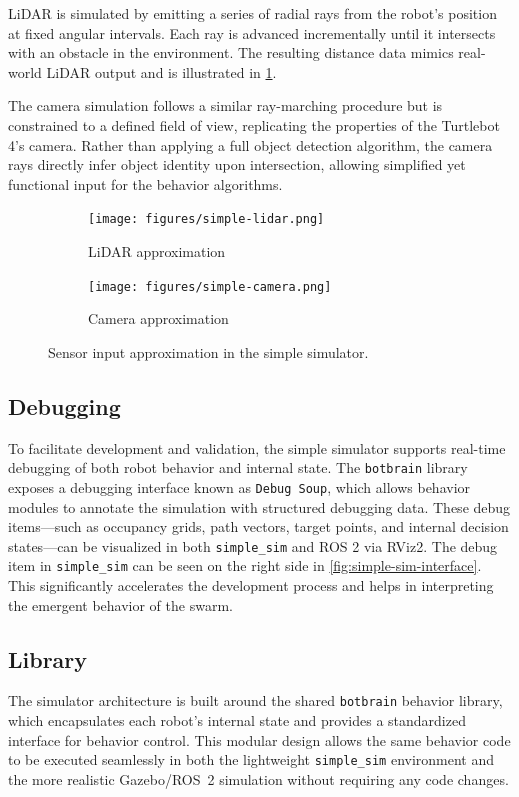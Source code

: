 LiDAR is simulated by emitting a series of radial rays from the robot's position at fixed angular intervals. Each ray is advanced incrementally until it intersects with an obstacle in the environment. The resulting distance data mimics real-world LiDAR output and is illustrated in \cref{fig:lidar-approximation}.

The camera simulation follows a similar ray-marching procedure but is constrained to a defined field of view, replicating the properties of the Turtlebot 4’s camera. Rather than applying a full object detection algorithm, the camera rays directly infer object identity upon intersection, allowing simplified yet functional input for the behavior algorithms.

\begin{figure}
    \centering
    \begin{subfigure}[b]{0.45\textwidth}
        \centering
        \texttt{[image: figures/simple-lidar.png]}
        \caption{LiDAR approximation}
        \label{fig:lidar-approximation}
    \end{subfigure}
    \hfill
    \begin{subfigure}[b]{0.45\textwidth}
        \centering
        \texttt{[image: figures/simple-camera.png]}
        \caption{Camera approximation}
        \label{fig:camera-approximation}
    \end{subfigure}
    \caption{Sensor input approximation in the simple simulator.}
    \label{fig:sensor-approximation}
\end{figure}

\subsection{Debugging}
To facilitate development and validation, the simple simulator supports real-time debugging of both robot behavior and internal state. The \texttt{botbrain} library exposes a debugging interface known as \texttt{Debug Soup}, which allows behavior modules to annotate the simulation with structured debugging data. These debug items—such as occupancy grids, path vectors, target points, and internal decision states—can be visualized in both \texttt{simple\_sim} and ROS 2 via RViz2. The debug item in \texttt{simple\_sim} can be seen on the right side in \cref{fig:simple-sim-interface}.
This significantly accelerates the development process and helps in interpreting the emergent behavior of the swarm.

\subsection{Library}
The simulator architecture is built around the shared \texttt{botbrain} behavior library, which encapsulates each robot’s internal state and provides a standardized interface for behavior control. This modular design allows the same behavior code to be executed seamlessly in both the lightweight \texttt{simple\_sim} environment and the more realistic Gazebo/ROS~2 simulation without requiring any code changes.

